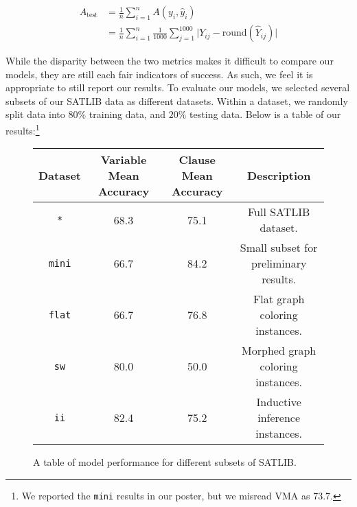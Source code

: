 \documentclass{article}
\begin{document}
\[
    \begin{split}
        A_\text{test} &= \frac{1}{n} \sum_{i = 1}^n A(y_i, \hat y_i)\\
        &= \frac{1}{n} \sum_{i = 1}^n \frac{1}{1000} \sum_{j = 1}^{1000} \lvert Y_{ij} - \text{round}(\hat Y_{ij})\rvert
    \end{split}
\]

\noindent
While the disparity between the two metrics makes it difficult to compare our models, they are still each fair
indicators of success. As such, we feel it is appropriate to still report our results. To evaluate our models, we selected
several subsets of our SATLIB data as different datasets. Within a dataset, we randomly split data into $80\%$ training
data, and $20\%$ testing data. Below is a table of our results:\footnote{We reported the \texttt{mini} results in our poster, but we misread VMA as 73.7.}

\begin{figure}[h] \label{fig}
    \centering
    \begin{tabular}{|c|c|c|c|}
        \hline
        Dataset & Variable Mean Accuracy & Clause Mean Accuracy & Description\\
        \hline
        \texttt{*} & 68.3 & 75.1 & Full SATLIB dataset.\\
        \texttt{mini} & 66.7 & 84.2 & Small subset for preliminary results.\\
        \texttt{flat} & 66.7 & 76.8 & Flat graph coloring instances.\\
        \texttt{sw} & 80.0 & 50.0 & Morphed graph coloring instances.\\
        \texttt{ii} & 82.4 & 75.2 & Inductive inference instances.\\
        \hline
    \end{tabular}
    \caption{A table of model performance for different subsets of SATLIB.}
\end{figure}
\end{document}
